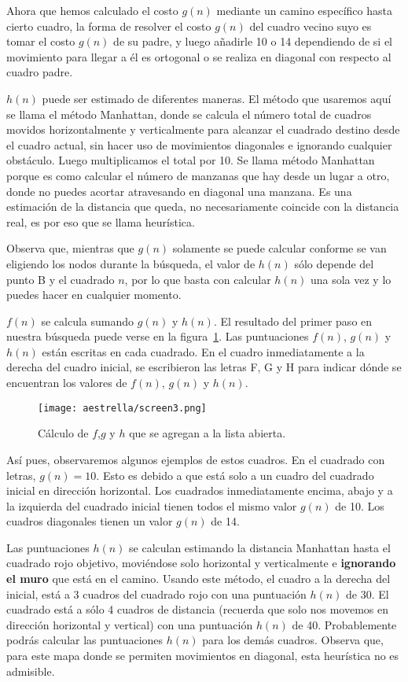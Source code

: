 Ahora que hemos calculado el costo \(g(n)\) mediante un camino específico hasta cierto cuadro, la forma de resolver el costo \(g(n)\) del cuadro vecino suyo es tomar el costo \(g(n)\) de su padre, y luego añadirle 10 o 14 dependiendo de si el movimiento para llegar a él es ortogonal o se realiza en diagonal con respecto al cuadro padre.

\(h(n)\) puede ser estimado de diferentes maneras. El método que usaremos aquí se llama el método Manhattan, donde se calcula el número total de cuadros movidos horizontalmente y verticalmente para alcanzar el cuadrado destino desde el cuadro actual, sin hacer uso de movimientos diagonales e ignorando cualquier obstáculo. Luego multiplicamos el total por 10. Se llama método Manhattan porque es como calcular el número de manzanas que hay desde un lugar a otro, donde no puedes acortar atravesando en diagonal una manzana. Es una estimación de la distancia que queda, no necesariamente coincide con la distancia real, es por eso que se llama heurística.

Observa que, mientras que \(g(n)\) solamente se puede calcular conforme se van eligiendo los nodos durante la búsqueda, el valor de \(h(n)\) sólo depende del punto B y el cuadrado \(n\), por lo que basta con calcular \(h(n)\) una sola vez y lo puedes hacer en cualquier momento.

\(f(n)\) se calcula sumando \(g(n)\) y \(h(n)\). El resultado del primer paso en nuestra búsqueda puede verse en la figura~\ref{fig:fig3P4}. Las puntuaciones \(f(n)\), \(g(n)\) y \(h(n)\) están escritas en cada cuadrado. En el cuadro inmediatamente a la derecha del cuadro inicial, se escribieron las letras F, G y H para indicar dónde se encuentran los valores de \(f(n)\), \(g(n)\) y \(h(n)\).

\begin{figure}[h!]
  \centering
  \texttt{[image: aestrella/screen3.png]}
  \caption{Cálculo de \(f\),\(g\) y \(h\) que se agregan a la lista abierta.}
  \label{fig:fig3P4}
\end{figure}

Así pues, observaremos algunos ejemplos de estos cuadros. En el cuadrado con letras, \(g(n)=10\). Esto es debido a que está solo a un cuadro del cuadrado inicial en dirección horizontal. Los cuadrados inmediatamente encima, abajo y a la izquierda del cuadrado inicial tienen todos el mismo valor \(g(n)\) de 10. Los cuadros diagonales tienen un valor \(g(n)\) de 14.

Las puntuaciones \(h(n)\) se calculan estimando la distancia Manhattan hasta el cuadrado rojo objetivo, moviéndose solo horizontal y verticalmente e \textbf{ignorando el muro} que está en el camino. Usando este método, el cuadro a la derecha del inicial, está a 3 cuadros del cuadrado rojo con una puntuación \(h(n)\) de 30. El cuadrado está a sólo 4 cuadros de distancia (recuerda que solo nos movemos en dirección horizontal y vertical) con una puntuación \(h(n)\) de 40. Probablemente podrás calcular las puntuaciones \(h(n)\) para los demás cuadros.  Observa que, para este mapa donde se permiten movimientos en diagonal, esta heurística no es admisible.

